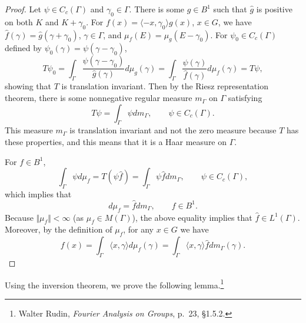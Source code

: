\documentclass{article}
\newcommand{\inner}[2]{\langle #1, #2 \rangle}
\newcommand{\norm}[1]{\Vert #1 \Vert}
\begin{document}
\begin{proof}
Let $\psi \in C_c(\Gamma)$ and $\gamma_0 \in \Gamma$. There is some $g \in B^1$ such that $\hat{g}$ is positive
on both $K$ and $K+\gamma_0$. For $f(x)=\inner{-x}{\gamma_0} g(x)$, $x \in G$, we have
$\hat{f}(\gamma)=\hat{g}(\gamma+\gamma_0)$, $\gamma \in \Gamma$, and $\mu_f(E) = \mu_g(E-\gamma_0)$. 
For $\psi_0 \in C_c(\Gamma)$ defined by $\psi_0(\gamma)=\psi(\gamma-\gamma_0)$,
\[
T\psi_0 = \int_\Gamma \frac{\psi(\gamma-\gamma_0)}{\hat{g}(\gamma)} d\mu_g(\gamma) = 
\int_\Gamma \frac{\psi(\gamma)}{\hat{f}(\gamma)} d\mu_f(\gamma) =T\psi,
\]
showing that $T$ is translation invariant. Then by the Riesz representation theorem, there is some
nonnegative regular  measure $m_\Gamma$ on $\Gamma$ satisfying
\[
T\psi = \int_\Gamma \psi dm_\Gamma, \qquad \psi \in C_c(\Gamma).
\]
This measure $m_\Gamma$ is translation invariant and not the zero measure because $T$ has these properties,
and this means 
that it is a Haar measure on $\Gamma$. 

For $f \in B^1$,
\[
\int_\Gamma \psi d\mu_f = T(\psi \hat{f}) = \int_\Gamma \psi \hat{f} dm_\Gamma,  \qquad \psi \in C_c(\Gamma),
\]
which implies that
\[
d\mu_f = \hat{f} dm_\Gamma, \qquad f \in B^1.
\]
Because $\norm{\mu_f}<\infty$ (as $\mu_f \in M(\Gamma)$), the above equality implies that $\hat{f} \in L^1(\Gamma)$. 
Moreover,  by the definition of $\mu_f$, for any $x \in G$ we have
\[
f(x) = \int_\Gamma \inner{x}{\gamma} d\mu_f(\gamma) = \int_\Gamma \inner{x}{\gamma} \hat{f} dm_\Gamma(\gamma).
\]

\end{proof}


Using the inversion theorem, we prove the following lemma.\footnote{Walter Rudin, {\em Fourier Analysis on Groups},
p.~23, \S 1.5.2.}
\end{document}
